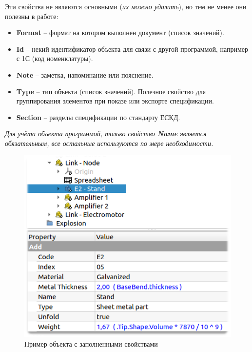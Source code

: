 \documentclass[a4paper,12pt]{article}
\begin{document}
Эти свойства не являются основными (\emph{их можно удалить}), но тем не менее они полезны в работе:
\begin{itemize}
	\item \textbf{Format} -- формат на котором выполнен документ (список значений).
	\item \textbf{Id} -- некий идентификатор объекта для связи с другой программой, например с 1С (код номенклатуры).
	\item \textbf{Note} -- заметка, напоминание или пояснение.
	\item \textbf{Type} -- тип объекта (список значений). Полезное свойство для группирования элементов при показе или экспорте спецификации.
	\item \textbf{Section} -- разделы спецификации по стандарту ЕСКД.
\end{itemize}

\begin{center}\emph{Для учёта объекта программой, только свойство \textbf{Name} является обязательным, все остальные используются по мере необходимости.}\end{center}

\begin{figure}[htp]
	\centering
	\includegraphics[scale=0.8]{img/properties.png}
	\caption{Пример объекта с заполненными свойствами}
	\label{sec:properties}
\end{figure}

\pagebreak
\end{document}
